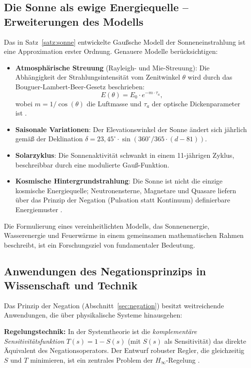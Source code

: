 ﻿\documentclass[a4paper,12pt]{article}
\theoremstyle{definition}
\begin{document}
\subsection{Die Sonne als ewige Energiequelle -- Erweiterungen des Modells}

Das in Satz~\ref{satz:sonne} entwickelte Gau\ss{}sche Modell der Sonneneinstrahlung
ist eine Approximation erster Ordnung. Genauere Modelle ber\"ucksichtigen:

\begin{itemize}
    \item \textbf{Atmosph\"arische Streuung} (Rayleigh- und Mie-Streuung): Die
          Abh\"angigkeit der Strahlungsintensit\"at vom Zenitwinkel $\theta$ wird durch
          das Bouguer-Lambert-Beer-Gesetz beschrieben:
          \[
              E(\theta) = E_0 \cdot e^{-m \cdot \tau_a},
          \]
          wobei $m = 1/\cos(\theta)$ die Luftmasse und $\tau_a$ der optische
          Dickenparameter ist \cite{Iqbal1983}.
    \item \textbf{Saisonale Variationen}: Der Elevationswinkel der Sonne \"andert sich
          j\"ahrlich gem\"a\ss{} der Deklination $\delta = 23{,}45^{\circ} \cdot \sin(360^{\circ}/365 \cdot (d-81))$.
    \item \textbf{Solarzyklus}: Die Sonnenaktivit\"at schwankt in einem 11-j\"ahrigen
          Zyklus, beschreibbar durch eine modulierte Gau\ss{}-Funktion.
    \item \textbf{Kosmische Hintergrundstrahlung}: Die Sonne ist nicht die einzige
          kosmische Energiequelle; Neutronensterne, Magnetare und Quasare liefern
          \"uber das Prinzip der Negation (Pulsation statt Kontinuum) definierbare
          Energiemuster \cite{Longair2011}.
\end{itemize}

Die Formulierung eines vereinheitlichten Modells, das Sonnenenergie, Wasserenergie
und Feuerw\"arme in einem gemeinsamen mathematischen Rahmen beschreibt, ist ein
Forschungsziel von fundamentaler Bedeutung.

\subsection{Anwendungen des Negationsprinzips in Wissenschaft und Technik}

Das Prinzip der Negation (Abschnitt~\ref{sec:negation}) besitzt weitreichende
Anwendungen, die \"uber physikalische Systeme hinausgehen:

\textbf{Regelungstechnik:} In der Systemtheorie ist die \emph{komplementäre
Sensitivit\"atsfunktion} $T(s) = 1 - S(s)$ (mit $S(s)$ als Sensitivit\"at) das
direkte \"Aquivalent des Negationsoperators. Der Entwurf robuster Regler,
die gleichzeitig $S$ und $T$ minimieren, ist ein zentrales Problem der
$H_\infty$-Regelung \cite{Doyle1992}.
\end{document}
